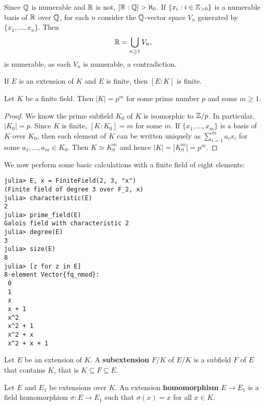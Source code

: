\begin{example}
	Since $\mathbb{Q}$ is numerable and 
	$\mathbb{R}$ is not, $[\mathbb{R}:\mathbb{Q}]>\aleph_0$. If $\{x_i:i\in\mathbb{Z}_{>0}\}$ 
	is a numerable basis of $\mathbb{R}$ over $\mathbb{Q}$, for each
	$n$ consider the $\mathbb{Q}$-vector space
	$V_n$ generated by $\{x_1,\dots,x_n\}$. Then 
	\[
		\mathbb{R}=\bigcup_{n\geq1}V_n,
	\]
	is numerable, as each $V_n$ is numerable, a contradiction.
\end{example}

If $E$ is an extension of $K$ and $E$ is finite,
then $[E:K]$ is finite. 

\begin{proposition}
	Let $K$ be a finite field. Then $|K|=p^m$ 
	for some prime number $p$ and some $m\geq1$. 
\end{proposition}

\begin{proof}
	We know the prime subfield $K_0$ of $K$ is isomorphic to $\mathbb{Z}/p$. 
	In particular, $|K_0|=p$. Since $K$ is finite, 
	$[K:K_0]=m$ for some $m$. If $\{x_1,\dots,x_m\}$ is a basis
	of $K$ over $K_0$, then each element
	of $K$ can be written uniquely as
	$\sum_{i=1}^ma_ix_i$ for some $a_1,\dots,a_m\in K_0$. Then
	$K\simeq K_0^m$ and hence $|K|=|K_0^m|=p^m$. 
\end{proof}

We now perform some basic calculations 
with a finite field of eight elements: 
\begin{lstlisting}
julia> E, x = FiniteField(2, 3, "x")
(Finite field of degree 3 over F_2, x)
julia> characteristic(E)
2
julia> prime_field(E)
Galois field with characteristic 2
julia> degree(E)
3
julia> size(E)
8
julia> [z for z in E]
8-element Vector{fq_nmod}:
 0
 1
 x
 x + 1
 x^2
 x^2 + 1
 x^2 + x
 x^2 + x + 1
\end{lstlisting}



\begin{definition}
	Let $E$ be an extension of $K$. A \textbf{subextension} $F/K$ 
	of $E/K$ is a subfield $F$ of $E$ that contains $K$, that is
	$K\subseteq F\subseteq E$. 
\end{definition}

\begin{definition}
	Let $E$ and $E_1$ be extensions over $K$. An extension
	\textbf{homomorphism} $E\to E_1$ is a 
	field homomorphism $\sigma\colon E\to E_1$ such that 
	$\sigma(x)=x$ for all $x\in K$. 
\end{definition}

